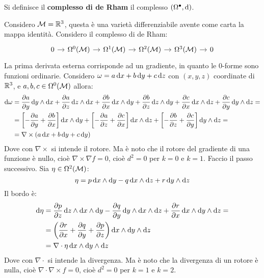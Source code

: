 \begin{definition}
  Si definisce il \textbf{complesso di de Rham}
  il complesso $ (\Omega^\bullet, \operatorname{d}\!{}) $.
\end{definition}
\begin{example}
  Considero $ \mathcal{M} = \mathbb{R}^{3} $, questa è una varietà differenziabile avente come
  carta la mappa identità. Considero il complesso di de Rham:
  \[
    \begin{tikzcd}[nodes = {column sep = 10 pt}]
      0 \rar & \Omega^0(\M) \rar & \Omega^1(\M) \rar & \Omega^2(\M) \rar & \Omega^3(\M) \rar & 0
    \end{tikzcd}
  \]
  La prima derivata esterna corrisponde ad un gradiente, in quanto le
  $ 0 $-forme sono funzioni ordinarie. Considero
  $ \omega = a \operatorname{d}\!{x} + b \operatorname{d}\!{y} + c \operatorname{d}\!{z} $ con $ (x,y,z) $ coordinate di
  $ \mathbb{R}^{3} $, e $ a, b, c \in \Omega^0(\mathcal{M}) $ allora:
  \begin{align*}
    \d \omega & =          \frac{\partial a}{\partial y} \d y \wedge \d x + \frac{\partial a}{\partial z} \d z \wedge \d x + \frac{\partial b}{\partial x} \d x \wedge \d y +
             \frac{\partial b}{\partial z} \d z \wedge \d y + \frac{\partial c}{\partial x} \d x \wedge \d z + \frac{\partial c}{\partial y} \d y \wedge \d z = \\
         & =      \left[ - \frac{\partial a}{\partial y} + \frac{\partial b}{\partial x} \right] \d x \wedge \d y +
                 \left[ - \frac{\partial a}{\partial z} + \frac{\partial c}{\partial x} \right] \d x \wedge \d z +
                 \left[ - \frac{\partial b}{\partial z} + \frac{\partial c}{\partial y} \right] \d y \wedge \d z =                      \\
         & =  \nabla \times (a \d x + b \d y + c \d y)
  \end{align*}
  Dove con $ \nabla \times $ si intende il rotore. Ma è noto che il rotore del gradiente di una funzione è nullo,
  cioè $ \nabla \times \nabla f = 0 $, cioè $ d^2 = 0 $ per $ k = 0 $ e $ k = 1 $.
  Faccio il passo successivo. Sia $ \eta \in \Omega^2(\mathcal{M}) $:
  \[
    \eta = p \operatorname{d}\!{x} \wedge \operatorname{d}\!{y} - q \operatorname{d}\!{x} \wedge \operatorname{d}\!{z} + r \operatorname{d}\!{y} \wedge \operatorname{d}\!{z}
  \]
  Il bordo è:
  \begin{align*}
    \d \eta & = \frac{\partial p}{\partial z} \d z \wedge \d x \wedge \d y - \frac{\partial q}{\partial y} \d y \wedge \d x \wedge \d z + \frac{\partial r}{\partial x} \d x \wedge \d y \wedge \d z = \\
    & = \left( \frac{\partial r}{\partial x} + \frac{\partial q}{\partial y} + \frac{\partial p}{\partial z} \right) \d x \wedge \d y \wedge \d z\\
    & = \nabla \cdot \eta \d x \wedge \d y \wedge \d z
  \end{align*}
  Dove con $ \nabla \cdot $ si intende la divergenza. Ma è noto che la divergenza di un rotore è nulla,
  cioè $ \nabla \cdot \nabla \times f = 0 $, cioè $ d^2 = 0 $ per $ k = 1 $ e $ k = 2 $.
\end{example}
